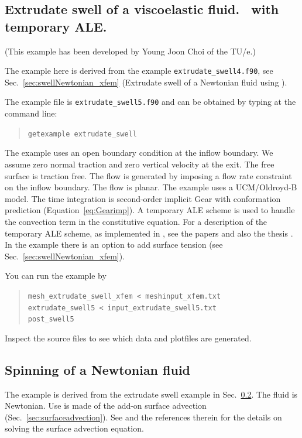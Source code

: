 \subsection{Extrudate swell of a viscoelastic fluid. \xfem\ with temporary ALE.}
\label{sec:swellviscoelasticxfem}

(This example has been developed by Young Joon Choi of the TU/e.)

The example here is derived from the example \texttt{extrudate\_swell4.f90},
see Sec.~\ref{sec:swellNewtonian_xfem}
(Extrudate swell of a Newtonian fluid using \xfem).

The example file is \texttt{extrudate\_swell5.f90} and can
be obtained by typing at the
command line:
\begin{quote}
   \texttt{getexample extrudate\_swell}
\end{quote}
The example uses an open boundary condition at the inflow boundary.
We assume zero normal traction and zero vertical velocity at the exit.
The free surface is traction free.
The flow is generated by imposing a flow rate constraint on the inflow
boundary. The flow is planar.
The example uses a UCM/Oldroyd-B model.
The time integration is second-order implicit Gear with conformation prediction
(Equation~\eqref{eq:Gearimp}).
A temporary ALE scheme is used to handle the convection term in the
constitutive equation. For a description of the temporary ALE scheme, as
implemented in \tfem, see the papers \cite{Choi11c,choi_alignment_2012} and also the
thesis \cite{Choi11b}.
In the example there is an option to add surface tension (see
Sec.~\ref{sec:swellNewtonian_xfem}).

You can run the example by
\begin{quote}
   \texttt{mesh\_extrudate\_swell\_xfem < meshinput\_xfem.txt}\\
   \texttt{extrudate\_swell5 < input\_extrudate\_swell5.txt}\\
   \texttt{post\_swell5}
\end{quote}
Inspect the source files to see which data and plotfiles are generated.

\subsection{Spinning of a Newtonian fluid}
\label{sec:spinningNewtonian}

The example is derived from the extrudate swell
example in Sec.~\ref{sec:spinningNewtonian}.
The fluid is Newtonian.
Use is made of the add-on surface advection (Sec.~\ref{sec:surfaceadvection}).
See \cite{Choi11c,Choi11b} and the references therein for the details on
solving the surface advection equation.

